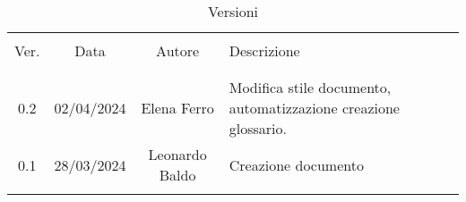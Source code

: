 \documentclass[italian,12pt]{article}
\begin{document}


\newpage



\begin{table}[!h]
	\caption{Versioni}
	\begin{center}
		\begin{tabular}{ c c c p{9cm} }
			\hline                                                                                               \\[-2ex]
			Ver. & Data       & Autore         & Descrizione                                                     \\
			\\[-2ex] \hline \\[-1.5ex]
			0.2  & 02/04/2024 & Elena Ferro    & Modifica stile documento, automatizzazione creazione glossario. \\
			0.1  & 28/03/2024 & Leonardo Baldo & Creazione documento                                             \\
			\\[-1.5ex] \hline
		\end{tabular}
	\end{center}
\end{table}

\newpage

\tableofcontents

\printglossary[style=myaltlistgroup,title=]
\end{document}

